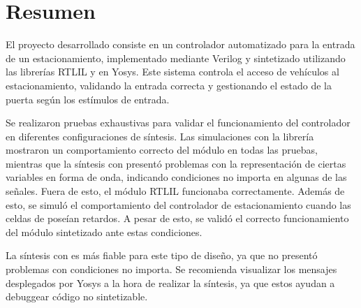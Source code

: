 \section{Resumen}

\hspace{0.35cm} El proyecto desarrollado consiste en un controlador automatizado para la entrada de un estacionamiento, 
implementado mediante Verilog y sintetizado utilizando las librerías RTLIL y  en Yosys. 
Este sistema controla el acceso de vehículos al estacionamiento, validando la entrada 
correcta y gestionando el estado de la puerta según los estímulos de entrada.

\hspace{0.35cm} Se realizaron pruebas exhaustivas para validar el funcionamiento del controlador en diferentes configuraciones 
de síntesis. Las simulaciones con la librería  mostraron un comportamiento correcto del módulo 
en todas las pruebas, mientras que la síntesis con  presentó problemas con la representación de ciertas 
variables en forma de onda, indicando condiciones no importa en algunas de las señales. Fuera de esto, el módulo RTLIL funcionaba correctamente.
Además de esto, se simuló el comportamiento del controlador de estacionamiento cuando las celdas de  poseían retardos. 
A pesar de esto, se validó el correcto funcionamiento del módulo sintetizado ante estas condiciones. 

\hspace{0.35cm} La síntesis con  es más fiable para 
este tipo de diseño, ya que no presentó problemas con condiciones no importa. 
Se recomienda visualizar los mensajes desplegados por Yosys a la hora de realizar la síntesis, ya que estos ayudan a debuggear código no sintetizable. 
